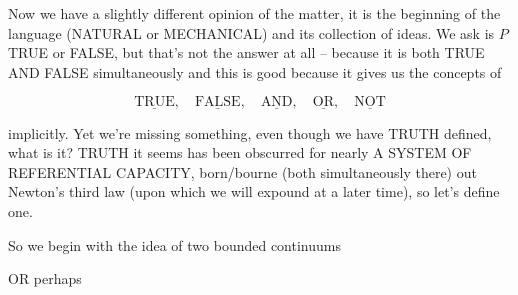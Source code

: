 \documentclass[12pt]{article}
\begin{document}
    Now we have a slightly different opinion of the matter, it is the beginning of
    the language (NATURAL or MECHANICAL) and its collection of ideas. We ask is $P$
    TRUE or FALSE, but that's not the answer at all -- because it is both TRUE AND
    FALSE simultaneously and this is good because it gives us the concepts of

    \[
        \underline{\text{TRUE}},\quad
        \underline{\text{FALSE}},\quad
        \underline{\text{AND}},\quad
        \underline{\text{OR}},\quad
        \underline{\text{NOT}}
    \]

    implicitly. Yet we're missing something, even though we have TRUTH defined,
    what is it? TRUTH it seems has been obscurred for nearly  
    A SYSTEM OF REFERENTIAL CAPACITY, born/bourne (both simultaneously there) out
    Newton's third law (upon
    which we will expound at a later time),
    so let's define one.

    So we begin with the idea of two bounded continuums

    \begin{center}
    \end{center}
    OR perhaps
    \begin{center}
    \end{center}
\end{document}
